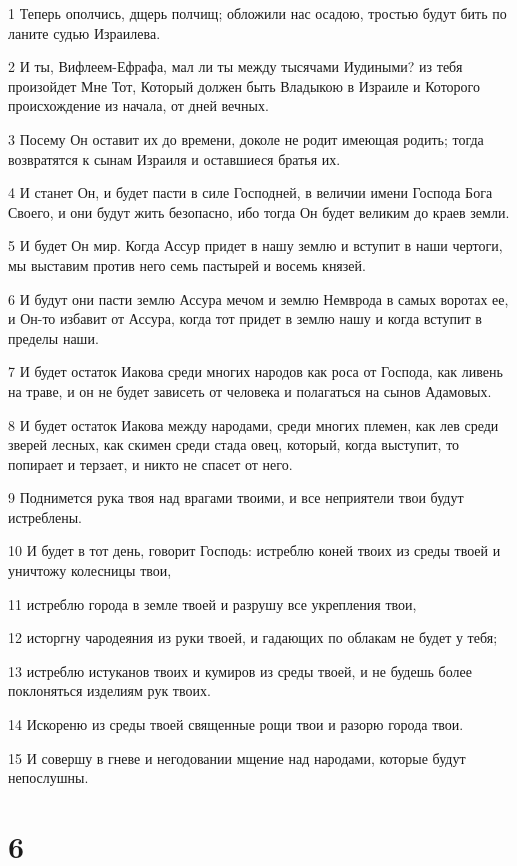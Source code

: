 \par 1 Теперь ополчись, дщерь полчищ; обложили нас осадою, тростью будут бить по ланите судью Израилева.
\par 2 И ты, Вифлеем-Ефрафа, мал ли ты между тысячами Иудиными? из тебя произойдет Мне Тот, Который должен быть Владыкою в Израиле и Которого происхождение из начала, от дней вечных.
\par 3 Посему Он оставит их до времени, доколе не родит имеющая родить; тогда возвратятся к сынам Израиля и оставшиеся братья их.
\par 4 И станет Он, и будет пасти в силе Господней, в величии имени Господа Бога Своего, и они будут жить безопасно, ибо тогда Он будет великим до краев земли.
\par 5 И будет Он мир. Когда Ассур придет в нашу землю и вступит в наши чертоги, мы выставим против него семь пастырей и восемь князей.
\par 6 И будут они пасти землю Ассура мечом и землю Немврода в самых воротах ее, и Он-то избавит от Ассура, когда тот придет в землю нашу и когда вступит в пределы наши.
\par 7 И будет остаток Иакова среди многих народов как роса от Господа, как ливень на траве, и он не будет зависеть от человека и полагаться на сынов Адамовых.
\par 8 И будет остаток Иакова между народами, среди многих племен, как лев среди зверей лесных, как скимен среди стада овец, который, когда выступит, то попирает и терзает, и никто не спасет от него.
\par 9 Поднимется рука твоя над врагами твоими, и все неприятели твои будут истреблены.
\par 10 И будет в тот день, говорит Господь: истреблю коней твоих из среды твоей и уничтожу колесницы твои,
\par 11 истреблю города в земле твоей и разрушу все укрепления твои,
\par 12 исторгну чародеяния из руки твоей, и гадающих по облакам не будет у тебя;
\par 13 истреблю истуканов твоих и кумиров из среды твоей, и не будешь более поклоняться изделиям рук твоих.
\par 14 Искореню из среды твоей священные рощи твои и разорю города твои.
\par 15 И совершу в гневе и негодовании мщение над народами, которые будут непослушны.

\chapter{6}

